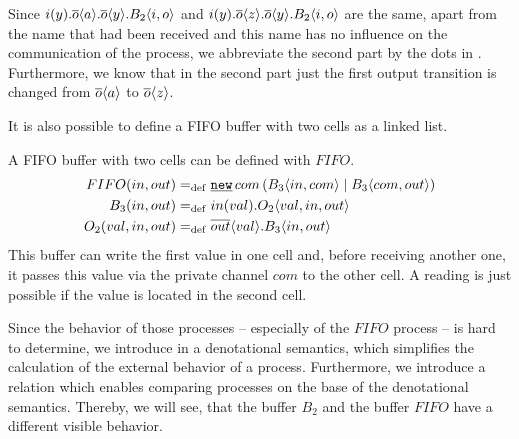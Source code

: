 Since $i(y).\overline{o}\langle a\rangle.\overline{o}\langle y\rangle.B_2\langle i,o\rangle$ and $i(y).\overline{o}\langle z\rangle.\overline{o}\langle y\rangle.B_2\langle i,o\rangle$ are the same, apart from the name that had been received and this name has no influence on the communication of the process, we abbreviate the second part by the dots in . Furthermore, we know that in the second part just the first output transition is changed from $\overline{o}\langle a\rangle$ to $\overline{o}\langle z\rangle$.

It is also possible to define a FIFO buffer with two cells as a linked list.

\begin{example} %
A FIFO buffer with two cells can be defined with $FIFO$.%
\label{ex_two_cell_buffer_milner}
\begin{align*}
	\procdef{FIFO}{in,out}&\define\procres[a]{com}{\procpar{\proccall{B_3}{in,com}}{\proccall{B_3}{com,out}}}\\
	\procdef{B_3}{in,out}&\define\inp{in}{val}.\proccall{O_2}{val,in,out} \\
	\procdef{O_2}{val,in,out}&\define\out{out}{val}.\proccall{B_3}{in,out}
\end{align*}
This buffer can write the first value in one cell and, before receiving another one, it passes this value via the private channel $com$ to the other cell. A reading is just possible if the value is located in the second cell.
\end{example}



Since the behavior of those processes -- especially of the $FIFO$ process -- is hard to determine, we introduce in  a denotational semantics, which simplifies the calculation of the external behavior of a process. Furthermore, we introduce a relation which enables comparing processes on the base of the denotational semantics. Thereby, we will see, that the buffer $B_2$ and the buffer $FIFO$ have a different visible behavior.
